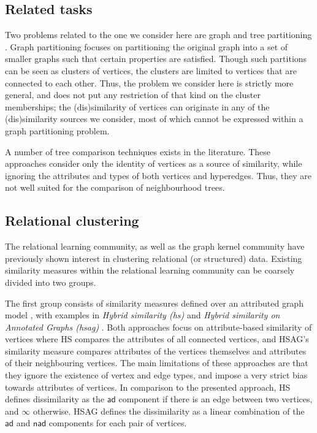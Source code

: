 \subsection{Related tasks}

Two problems related to the one we consider here are graph and tree partitioning \cite{bader2012dimacs}.
Graph partitioning focuses on partitioning the original graph into a set of smaller graphs such that certain properties are satisfied.
Though such partitions can be seen as clusters of vertices, the clusters are limited to vertices that are connected to each other.
Thus, the problem we consider here is strictly more general, and does not put any restriction of that kind on the cluster memberships; the (dis)similarity of vertices can originate in any of the (dis)similarity sources we consider, most of which cannot be expressed within a graph partitioning problem.



A number of tree comparison techniques \cite{Bille:2005} exists in the literature.
These approaches consider only the identity of vertices as a source of similarity, while ignoring the attributes and types of both vertices and hyperedges.
Thus, they are not well suited for the comparison of neighbourhood trees.

\subsection{Relational clustering}
\label{sec:RelClust}

The relational learning community, as well as the graph kernel community have previously shown interest in clustering relational (or structured) data.
Existing similarity measures within the relational learning community can be coarsely divided into two groups.


The first group consists of similarity measures defined over an attributed graph model \cite{Pfeiffer2014}, with examples in  \textit{Hybrid similarity (\gls{hs})} \cite{Neville03clusteringrelational} and \textit{Hybrid similarity on Annotated Graphs (\gls{hsag})} \cite{WitsenburgB11a}.
Both approaches focus on attribute-based similarity of vertices where HS compares the attributes of all connected vertices, and HSAG's similarity measure compares attributes of the vertices themselves and attributes of their neighbouring vertices.
The main limitations of these approaches are that they ignore the existence of vertex and edge types, and impose a very strict bias towards attributes of vertices.
In comparison to the presented approach, HS defines dissimilarity as the $\mathsf{ad}$ component if there is an edge between two vertices, and $\infty$ otherwise.
HSAG defines the dissimilarity as a linear combination of the $\mathsf{ad}$ and $\mathsf{nad}$ components for each pair of vertices.



